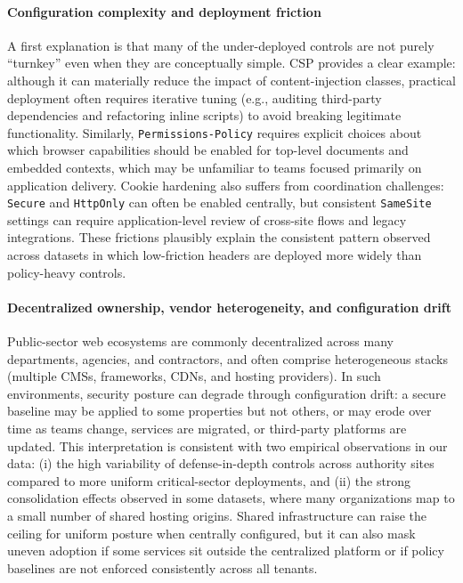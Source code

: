 \documentclass[a4paper,fleqn]{cas-sc}
\begin{document}
    \paragraph{Configuration complexity and deployment friction}
    A first explanation is that many of the under-deployed controls are not purely ``turnkey'' even when they are conceptually simple. 
    CSP provides a clear example: although it can materially reduce the impact of content-injection classes, practical deployment often requires iterative tuning (e.g., auditing third-party dependencies and refactoring inline scripts) to avoid breaking legitimate functionality. 
    Similarly, \texttt{Permissions-Policy} requires explicit choices about which browser capabilities should be enabled for top-level documents and embedded contexts, which may be unfamiliar to teams focused primarily on application delivery. 
    Cookie hardening also suffers from coordination challenges: \texttt{Secure} and \texttt{HttpOnly} can often be enabled centrally, but consistent \texttt{SameSite} settings can require application-level review of cross-site flows and legacy integrations.
    These frictions plausibly explain the consistent pattern observed across datasets in which low-friction headers are deployed more widely than policy-heavy controls.

    \paragraph{Decentralized ownership, vendor heterogeneity, and configuration drift}
    Public-sector web ecosystems are commonly decentralized across many departments, agencies, and contractors, and often comprise heterogeneous stacks (multiple CMSs, frameworks, CDNs, and hosting providers). 
    In such environments, security posture can degrade through configuration drift: a secure baseline may be applied to some properties but not others, or may erode over time as teams change, services are migrated, or third-party platforms are updated.
    This interpretation is consistent with two empirical observations in our data: 
    (i) the high variability of defense-in-depth controls across authority sites compared to more uniform critical-sector deployments, and 
    (ii) the strong consolidation effects observed in some datasets, where many organizations map to a small number of shared hosting origins. 
    Shared infrastructure can raise the ceiling for uniform posture when centrally configured, but it can also mask uneven adoption if some services sit outside the centralized platform or if policy baselines are not enforced consistently across all tenants.
    
\end{document}
